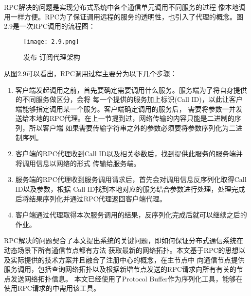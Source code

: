 RPC解决的问题是实现分布式系统中各个通信单元调用不同服务的过程
像本地调用一样方便。RPC为了保证调用远程的服务的透明性，也引入了代理的概念\cite{5694349}。图2.9是一次RPC调用的流程图：
\begin{figure}[H]
  \centering
  \texttt{[image: 2.9.png]}
  \caption{发布-订阅代理架构}
  \label{fig:12}
\end{figure}
从图2.9可以看出，RPC调用过程主要分为以下几个步骤：
\begin{enumerate}
  \item 客户端发起调用之前，首先要确定需要调用什么服务。服务端为了将自身提供的不同服务做区分，会将
  每一个提供的服务加上标识(Call ID)，以此让客户端能够指定调用某一个服务。客户端确定调用的服务后，
  需要将参数一并发送给本地的RPC代理。在上一节提到过，网络传输的内容只能是二进制的序列，所以客户端
  如果需要传输字符串之外的参数必须要将参数序列化为二进制序列。
  \item 客户端的RPC代理收到Call ID以及相关参数后，找到提供此服务的服务端并将调用信息以网络的形式
  传输给服务端。
  \item 服务端的RPC代理收到服务调用请求后，首先会对调用信息反序列化取得Call ID以及参数，根据
  Call ID找到本地对应的服务结合参数进行处理，处理完成后将结果序列化并通过RPC代理返回客户端代理。
  \item 客户端通过代理取得本次服务调用的结果，反序列化完成后就可以继续之后的作业。
\end{enumerate}

RPC解决的问题契合了本文提出系统的关键问题，即如何保证分布式通信系统在动态场景下所有通信节点都有方法
获取最新的网络拓扑。本文基于RPC的思想以及实际提供的技术方案并且融合了注册中心的概念，在主节点中
向通信节点提供服务调用，包括查询网络拓扑以及根据新增节点发送的RPC请求向所有有关的节点发送网络拓扑信息。
本文已经使用了Protocol Buffer作为序列化工具，能够在使用RPC请求的中需用该工具。

